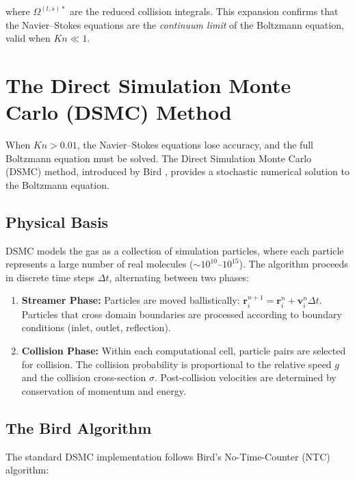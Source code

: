 \noindent where $\Omega^{(l,s)*}$ are the reduced collision integrals. This expansion confirms that the Navier--Stokes equations are the \textit{continuum limit} of the Boltzmann equation, valid when $Kn \ll 1$.

\section{The Direct Simulation Monte Carlo (DSMC) Method}

When $Kn > 0.01$, the Navier--Stokes equations lose accuracy, and the full Boltzmann equation must be solved. The Direct Simulation Monte Carlo (DSMC) method, introduced by Bird \cite{bird1994molecular}, provides a stochastic numerical solution to the Boltzmann equation.

\subsection{Physical Basis}

DSMC models the gas as a collection of simulation particles, where each particle represents a large number of real molecules ($\sim 10^{10}$--$10^{15}$). The algorithm proceeds in discrete time steps $\Delta t$, alternating between two phases:

\begin{enumerate}
    \item \textbf{Streamer Phase:} Particles are moved ballistically: $\mathbf{r}_{i}^{n+1} = \mathbf{r}_{i}^{n} + \mathbf{v}_{i}^{n} \Delta t$. Particles that cross domain boundaries are processed according to boundary conditions (inlet, outlet, reflection).
    
    \item \textbf{Collision Phase:} Within each computational cell, particle pairs are selected for collision. The collision probability is proportional to the relative speed $g$ and the collision cross-section $\sigma$. Post-collision velocities are determined by conservation of momentum and energy.
\end{enumerate}

\subsection{The Bird Algorithm}

The standard DSMC implementation follows Bird's No-Time-Counter (NTC) algorithm:

